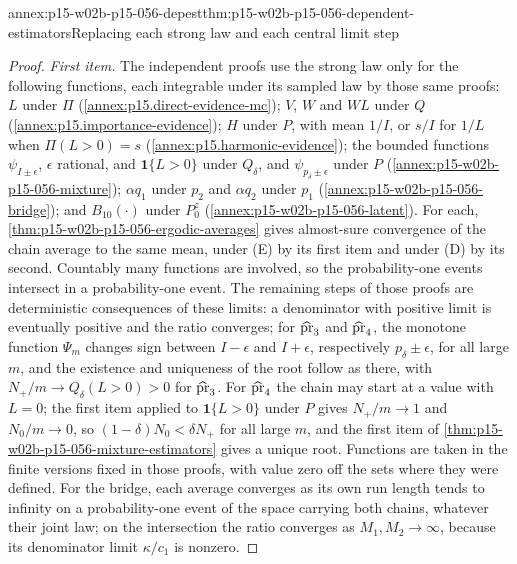\begin{annexitem}{annex:p15-w02b-p15-056-depest}{thm:p15-w02b-p15-056-dependent-estimators}{Replacing each strong law and each central limit step}
\begin{proof}
\emph{First item.} The independent proofs use the strong law only for the
following functions, each integrable under its sampled law by those same
proofs: \(L\) under \(\Pi\)
(\cref{annex:p15.direct-evidence-mc}); \(V\), \(W\) and \(WL\) under \(Q\)
(\cref{annex:p15.importance-evidence}); \(H\) under \(P\), with mean
\(1/I\), or \(s/I\) for \(1/L\) when \(\Pi(L>0)=s\)
(\cref{annex:p15.harmonic-evidence}); the bounded functions
\(\psi_{I\pm\epsilon}\), \(\epsilon\) rational, and \(\mathbf 1\{L>0\}\)
under \(Q_\delta\), and \(\psi_{p_\delta\pm\epsilon}\) under \(P\)
(\cref{annex:p15-w02b-p15-056-mixture}); \(\alpha q_1\) under \(p_2\) and
\(\alpha q_2\) under \(p_1\) (\cref{annex:p15-w02b-p15-056-bridge}); and
\(B_{10}(\cdot)\) under \(P^z_0\) (\cref{annex:p15-w02b-p15-056-latent}).
For each, \cref{thm:p15-w02b-p15-056-ergodic-averages} gives almost-sure
convergence of the chain average to the same mean, under (E) by its first
item and under (D) by its second. Countably many functions are involved,
so the probability-one events intersect in a probability-one event. The
remaining steps of those proofs are deterministic consequences of these
limits: a denominator with positive limit is eventually positive and the
ratio converges; for \(\widehat{\rm pr}_3\) and \(\widehat{\rm pr}_4\), the
monotone function \(\Psi_m\) changes sign between \(I-\epsilon\) and
\(I+\epsilon\), respectively \(p_\delta\pm\epsilon\), for all large \(m\),
and the existence and uniqueness of the root follow as there, with
\(N_+/m\to Q_\delta(L>0)>0\) for \(\widehat{\rm pr}_3\). For
\(\widehat{\rm pr}_4\) the chain may start at a value with \(L=0\); the
first item applied to \(\mathbf 1\{L>0\}\) under \(P\) gives
\(N_+/m\to1\) and \(N_0/m\to0\), so \((1-\delta)N_0<\delta N_+\) for all
large \(m\), and the first item of
\cref{thm:p15-w02b-p15-056-mixture-estimators} gives a unique root.
Functions are taken in the finite versions fixed in those proofs, with
value zero off the sets where they were defined. For the bridge, each average converges as
its own run length tends to infinity on a probability-one event of the
space carrying both chains, whatever their joint law; on the intersection
the ratio converges as \(M_1,M_2\to\infty\), because its denominator
limit \(\kappa/c_1\) is nonzero.


\end{proof}
\end{annexitem}
